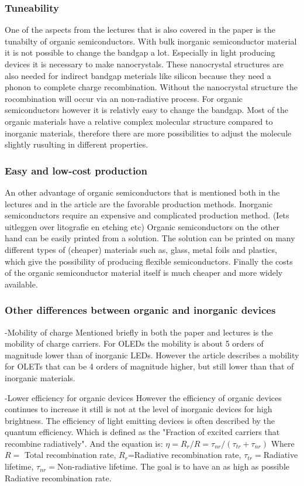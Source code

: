 \subsubsection{Tuneability}
One of the aspects from the lectures that is also covered in the paper is the tunabilty of organic semiconductors. With bulk inorganic semiconductor material it is not possible to change the bandgap a lot. Especially in light producing devices it is necessary to make nanocrystals. These nanocrystal structures are also needed for indirect bandgap meterials like silicon because they need a phonon to complete charge recombination. Without the nanocrystal structure the rocombination will occur via an non-radiative process. For organic semiconductors however it is relativly easy to change the bandgap. Most of the organic materials have a relative complex molecular structure compared to inorganic materials, therefore there are more possibilities to adjust the molecule slightly rusulting in different properties. 
\subsubsection{Easy and low-cost production}
An other advantage of organic semiconductors that is mentioned both in the lectures and in the article are the favorable production methods. Inorganic semiconductors require an expensive and complicated production method. (Iets uitleggen over litografie en etching etc) Organic semiconductors on the other hand can be easily printed from a solution. The solution can be printed on many different types of (cheaper) materials such as, glass, metal foils and plastics, which give the possibility of producing flexible semiconductors. Finally the costs of the organic semiconductor material itself is much cheaper and more widely available.
\subsubsection{Other differences between organic and inorganic devices}
-Mobility of charge
Mentioned briefly in both the paper and lectures is the mobility of charge carriers. For OLEDs the mobility is about 5 orders of magnitude lower than of inorganic LEDs. However the article describes a mobility for OLETs that can be 4 orders of magnitude higher, but still lower than that of inorganic materials.

-Lower efficiency for organic devices
However the efficiency of organic devices continues to increase it still is not at the level of inorganic devices for high brightness. The efficiency of light emitting devices is often described by the quantum efficiency. Which is defined as the "Fraction of excited carriers that recombine radiatively". And the equation is: $\eta = R_{r}/R = \tau_{nr}/(\tau_{tr}+\tau_{nr})$ Where $R=$ Total recombination rate, $R_{r}$=Radiative recombination rate, $\tau_{tr}=$Radiative lifetime, $\tau_{nr}=$Non-radiative lifetime. The goal is to have an as high as possible Radiative recombination rate. 

